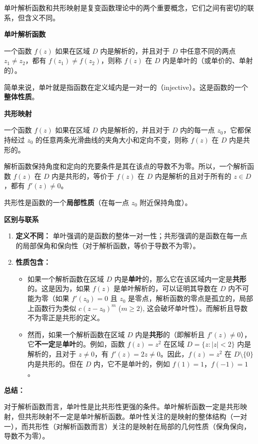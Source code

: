 单叶解析函数和共形映射是复变函数理论中的两个重要概念，它们之间有密切的联系，但含义不同。

\textbf{单叶解析函数}

一个函数 $f(z)$ 如果在区域 $D$ 内是解析的，并且对于 $D$ 中任意不同的两点 $z_1 \neq z_2$，都有 $f(z_1) \neq f(z_2)$，则称 $f(z)$ 在 $D$ 内是单叶的（或单价的、单射的）。

简单来说，单叶就是指函数在定义域内是一对一的（injective）。这是函数的一个\textbf{整体性质}。

\textbf{共形映射}

一个函数 $f(z)$ 如果在区域 $D$ 内是解析的，并且对于 $D$ 内的每一点 $z_0$，它都保持经过 $z_0$ 的任意两条光滑曲线的夹角大小和定向不变，则称 $f(z)$ 在 $D$ 内是共形的。

解析函数保持角度和定向的充要条件是其在该点的导数不为零。所以，一个解析函数 $f(z)$ 在 $D$ 内是共形的，等价于 $f(z)$ 在 $D$ 内是解析的且对于所有的 $z \in D$，都有 $f'(z) \neq 0$。

共形性是函数的一个\textbf{局部性质}（在每一点 $z_0$ 附近保持角度）。

\textbf{区别与联系}

\begin{enumerate}
	\item \textbf{定义不同：} 单叶强调的是函数的整体一对一性；共形强调的是函数在每一点的局部保角和保向性（对于解析函数，等价于导数不为零）。
	\item \textbf{性质包含：}
	\begin{itemize}
		\item 如果一个解析函数在区域 $D$ 内是\textbf{单叶}的，那么它在该区域内一定是\textbf{共形}的。这是因为，如果 $f(z)$ 是单叶解析的，可以证明其导数在 $D$ 内不可能为零（如果 $f'(z_0)=0$ 且 $z_0$ 是零点，解析函数的零点是孤立的，局部上函数行为类似 $c(z-z_0)^m$ ($m \geq 2$), 这会破坏单叶性）。而解析且导数不为零正是共形的定义。
		\item 然而，如果一个解析函数在区域 $D$ 内是\textbf{共形}的（即解析且 $f'(z) \neq 0$），它\textbf{不一定}是\textbf{单叶}的。例如，函数 $f(z) = z^2$ 在区域 $D = \{z : |z| < 2\}$ 内是解析的，且对于 $z \neq 0$，有 $f'(z) = 2z \neq 0$。因此，$f(z)=z^2$ 在 $D \setminus \{0\}$ 内是共形的。但在 $D$ 内，它不是单叶的，例如 $f(1) = 1$，$f(-1) = 1$。
	\end{itemize}
\end{enumerate}

\textbf{总结：}

对于解析函数而言，单叶性是比共形性更强的条件。单叶解析函数一定是共形映射，但共形映射不一定是单叶解析函数。单叶性关注的是映射的整体结构（一对一），而共形性（对解析函数而言）关注的是映射在局部的几何性质（保角保向，导数不为零）。

